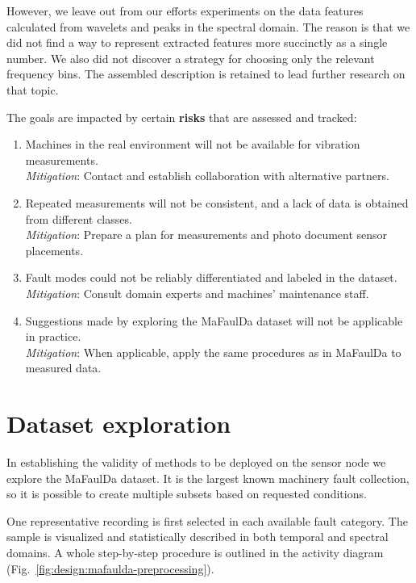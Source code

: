 However, we leave out from our efforts experiments on the data features calculated from wavelets and peaks in the spectral domain. The reason is that we did not find a way to represent extracted features more succinctly as a single number. We also did not discover a strategy for choosing only the relevant frequency bins. The assembled description is retained to lead further research on that topic.

The goals are impacted by certain \textbf{risks} that are assessed and tracked:
\begin{enumerate}[label=R-\arabic*., font=\bfseries]
\itemsep0pt
\item Machines in the real environment will not be available for vibration measurements. \\ \emph{Mitigation}: Contact and establish collaboration with alternative partners. 
\item Repeated measurements will not be consistent, and a lack of data is obtained from different classes.
\\ \emph{Mitigation}: Prepare a plan for measurements and photo document sensor placements. 
\item Fault modes could not be reliably differentiated and labeled in the dataset.
\\ \emph{Mitigation}: Consult domain experts and machines' maintenance staff.
\item Suggestions made by exploring the MaFaulDa dataset will not be applicable in practice. \\
\emph{Mitigation}: When applicable, apply the same procedures as in MaFaulDa to measured data.
\end{enumerate}


\section{Dataset exploration}
In establishing the validity of methods to be deployed on the sensor node we explore the MaFaulDa dataset. It is the largest known machinery fault collection, so it is possible to create multiple subsets based on requested conditions. 

One representative recording is first selected in each available fault category. The sample is visualized and statistically described in both temporal and spectral domains. A whole step-by-step procedure is outlined in the activity diagram (Fig.~\ref{fig:design:mafaulda-preprocessing}).

